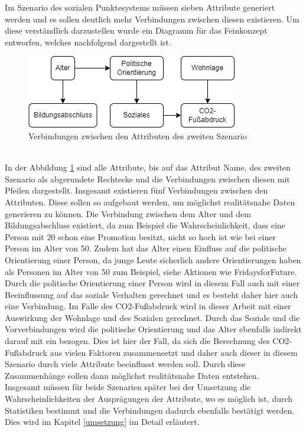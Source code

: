 \begin{onehalfspace}
Im Szenario des sozialen Punktesystems müssen sieben Attribute generiert werden und es sollen deutlich mehr Verbindungen zwischen diesen existieren. Um diese verständlich darzustellen wurde ein Diagramm für das Feinkonzept entworfen, welches nachfolgend dargestellt ist.\\
\begin{figure}[h]
    \centering
    \includegraphics{Diagramme/Verbindung_der_Attribute_S2.jpg}
    \caption{Verbindungen zwischen den Attributen des zweiten Szenario}
    \label{fig:VerbindungenS2}
\end{figure}\\
In der Abbildung \ref{fig:VerbindungenS2} sind alle Attribute, bis auf das Attribut Name, des zweiten Szenario als abgerundete Rechtecke und die Verbindungen zwischen diesen mit Pfeilen dargestellt. Insgesamt existieren fünf Verbindungen zwischen den Attributen. Diese sollen so aufgebaut werden, um möglichst realitätsnahe Daten generieren zu können. Die Verbindung zwischen dem Alter und dem Bildungsabschluss existiert, da zum Beispiel die Wahrscheinlichkeit, dass eine Person mit 20 schon eine Promotion besitzt, nicht so hoch ist wie bei einer Person im Alter von 50. Zudem hat das Alter einen Einfluss auf die politische Orientierung einer Person, da junge Leute sicherlich andere Orientierungen haben als Personen im Alter von 50 zum Beispiel, siehe Aktionen wie \glqq{}FridaysforFuture\grqq{}. Durch die politische Orientierung einer Person wird in diesem Fall auch mit einer Beeinflussung auf das soziale Verhalten gerechnet und es besteht daher hier auch eine Verbindung. Im Falle des CO2-Fußabdruck wird in dieser Arbeit mit einer Auswirkung der Wohnlage und des Sozialen gerechnet. Durch das Soziale und die Vorverbindungen wird die politische Orientierung und das Alter ebenfalls indirekt darauf mit ein bezogen. Dies ist hier der Fall, da sich die Berechnung des CO2-Fußabdruck aus vielen Faktoren zusammensetzt und daher auch dieser in diesem Szenario durch viele Attribute beeinflusst werden soll. Durch diese Zusammenhänge sollen dann möglichst realitätsnahe Daten entstehen.\\
Insgesamt müssen für beide Szenarien später bei der Umsetzung die Wahrscheinlichkeiten der Ausprägungen der Attribute, wo es möglich ist, durch Statistiken bestimmt und die Verbindungen dadurch ebenfalls bestätigt werden. Dies wird im Kapitel \ref{umsetzung} im Detail erläutert.\\

\end{onehalfspace}
